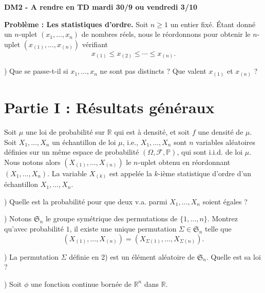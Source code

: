 \documentclass[12pt,a4paper]{article}
\begin{document}
\begin{center}
\textbf{DM2 - A rendre en TD mardi 30/9 ou vendredi 3/10}
\end{center}

\bigskip

\noindent
\textbf{Problème : Les statistiques d'ordre.} Soit $n \geq 1$ un entier fixé. Étant donné un $n$-uplet $(x_1, \dots, x_n)$ de nombres réels, nous le réordonnons pour obtenir le $n$-uplet $(x_{(1)}, \dots, x_{(n)})$ vérifiant
\[
x_{(1)} \leq x_{(2)} \leq \cdots \leq x_{(n)}.
\]

) Que se passe-t-il si $x_1, \dots, x_n$ ne sont pas distincts ? Que valent $x_{(1)}$ et $x_{(n)}$ ?

\bigskip

\noindent
\section{Partie I : Résultats généraux}

\medskip

\noindent
Soit $\mu$ une loi de probabilité sur $\mathbb{R}$ qui est à densité, et soit $f$ une densité de $\mu$. Soit $X_1, \dots, X_n$ un échantillon de loi $\mu$, i.e., $X_1, \dots, X_n$ sont $n$ variables aléatoires définies sur un même espace de probabilité $(\Omega, \mathscr{F}, \mathbb{P})$, qui sont i.i.d. de loi $\mu$. Nous notons alors $(X_{(1)}, \dots, X_{(n)})$ le $n$-uplet obtenu en réordonnant $(X_1, \dots, X_n)$. La variable $X_{(k)}$ est appelée la $k$-ième statistique d’ordre d’un échantillon $X_1, \dots, X_n$.

\medskip

) Quelle est la probabilité pour que deux v.a. parmi $X_1, \dots, X_n$ soient égales ?

\medskip

) Notons $\mathfrak{S}_n$ le groupe symétrique des permutations de $\{1, \dots, n\}$. Montrez qu’avec probabilité $1$, il existe une unique permutation $\Sigma \in \mathfrak{S}_n$ telle que
\[
(X_{(1)}, \dots, X_{(n)}) = (X_{\Sigma(1)}, \dots, X_{\Sigma(n)}).
\]

\medskip

) La permutation $\Sigma$ définie en 2) est un élément aléatoire de $\mathfrak{S}_n$. Quelle est sa loi ?

\medskip

) Soit $\phi$ une fonction continue bornée de $\mathbb{R}^n$ dans $\mathbb{R}$.
\end{document}
